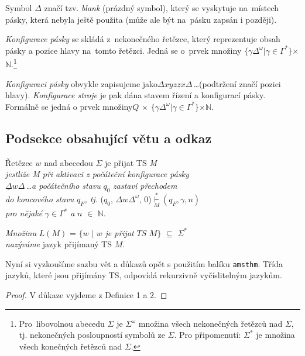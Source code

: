 \documentclass[a4paper, 11pt]{article}
\theoremstyle{definition}
\begin{document}
\begin{twocolumn}
Symbol $\Delta$ značí tzv. \textit{blank} (prázdný symbol), který
se vyskytuje na~místech pásky, která nebyla ještě použita
(může ale být na~pásku zapsán i později).

\textit{Konfigurace pásky} se skládá z~nekonečného řetězce, který reprezentuje obsah pásky a pozice hlavy na~tomto řetězci. Jedná se o~prvek množiny $\{$$\gamma$$\Delta^\omega$$\mid$$\gamma$$\in$$\Gamma^\ast$$\}$$\times$$\mathbb{N}$.\footnote{Pro~libovolnou abecedu $\Sigma$ je $\Sigma^\omega$ množina všech nekonečných řetězců nad $\Sigma$, tj. nekonečných posloupností symbolů ze $\Sigma$. Pro připomenutí: $\Sigma^\ast$ je množina všech konečných řetězců nad $\Sigma$.}

\textit{Konfiguraci pásky} obvykle zapisujeme jako\newline $\Delta$$x$$y$$z$$\underline{z}$$x$$\Delta$\,\dots(podtržení značí pozici hlavy). \textit{Konfigurace stroje} je pak dána stavem řízení a konfigurací pásky. Formálně se jedná o prvek množiny\newline$Q$ $\times$ $\{$$\gamma$$\Delta^\omega$$\mid$$\gamma$$\in$$\Gamma^\ast$$\}$$\times$$\mathbb{N}$.

\subsection{Podsekce obsahující větu a odkaz}
 Řetězec $w$ nad abecedou $\Sigma$ je přijat TS \textit{M\\ jestliže M při aktivaci z počáteční konfigurace pásky}\\ $\underline{\Delta}$$w$$\Delta$\,\dots \textit{a počátečního stavu} $q_0$ \textit{zastaví přechodem\\do koncového stavu} $q_F$\textit{, tj.} ($q_0$, $\Delta$$w$$\Delta^\omega$, 0)$\underset{M}{\overset{\ast}{\vdash}} (q_F, \gamma, n)$\\\textit{pro nějaké} $\gamma$$\in$$\Gamma^\ast$ \textit{a} $n$ $\in$ $\mathbb{N}$.

\textit{Množinu} $L(M)$ = $\{$$w$ $\mid$ $w$ \textit{je přijat} $T$$S$ $M$$\}$ $\subseteq$ $\Sigma^\ast$\\\textit{nazýváme} jazyk přijímaný TS $M$.

Nyní si vyzkoušíme sazbu vět a důkazů opět s použitím balíku \verb|amsthm|.
\veta Třída jazyků, které jsou přijímány TS, odpovídá rekurzivně vyčíslitelným jazykům.

\begin{proof}
V důkaze vyjdeme z Definice 1 a 2.
\end{proof}


\end{twocolumn}
\end{document}
